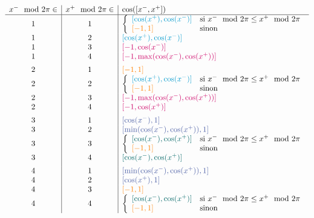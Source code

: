   $\begin{array}{c | c | l}
  x^- \mod 2\pi \in & x^+ \mod 2\pi \in & \cos([x^-, x^+])\\\hline
  1 & 1 & \left\{\begin{array}{ll}\b{[\cos(x^+), \cos(x^-)]} & \mbox{si } x^- \mod 2\pi \leq x^+ \mod 2\pi\\\o{[-1, 1]} & \mbox{sinon}\end{array}\right.\\
  1 & 2 & \b{[\cos(x^+), \cos(x^-)]}\\
  1 & 3 & \r{[-1, \cos(x^-)]}\\
  1 & 4 & \r{[-1, \max(\cos(x^-), \cos(x^+))]}\\[5pt]
  
  2 & 1 & \o{[-1, 1]}\\
  2 & 2 & \left\{\begin{array}{ll}\b{[\cos(x^+), \cos(x^-)]} & \mbox{si } x^- \mod 2\pi \leq x^+ \mod 2\pi\\\o{[-1, 1]} & \mbox{sinon}\end{array}\right.\\
  2 & 3 & \r{[-1, \max(\cos(x^-), \cos(x^+))]}\\
  2 & 4 & \r{[-1, \cos(x^+)]}\\[5pt]
  
  3 & 1 & \v{[\cos(x^-), 1]}\\
  3 & 2 & \v{[\min(\cos(x^-), \cos(x^+)), 1]}\\
  3 & 3 & \left\{\begin{array}{ll}\g{[\cos(x^-), \cos(x^+)]} & \mbox{si } x^- \mod 2\pi \leq x^+ \mod 2\pi\\\o{[-1, 1]} & \mbox{sinon}\end{array}\right.\\
  3 & 4 & \g{[\cos(x^-), \cos(x^+)]}\\[5pt]
  
  4 & 1 & \v{[\min(\cos(x^-), \cos(x^+)), 1]}\\
  4 & 2 & \v{[\cos(x^+), 1]}\\
  4 & 3 & \o{[-1, 1]}\\
  4 & 4 & \left\{\begin{array}{ll}\g{[\cos(x^-), \cos(x^+)]} & \mbox{si } x^- \mod 2\pi \leq x^+ \mod 2\pi\\\o{[-1, 1]} & \mbox{sinon}\end{array}\right.\\
  \end{array}$

